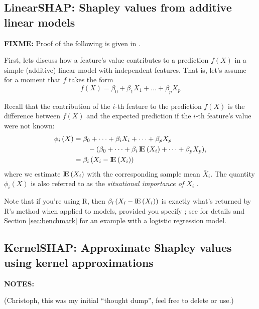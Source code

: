 \subsection{LinearSHAP: Shapley values from additive linear models \label{sec:LinearSHAP}}

\textbf{FIXME:} Proof of the following is given in
\citet{aas-2020-explaining}.

First, lets discuss how a feature's value contributes to a prediction
\(f\left(X\right)\) in a simple (additive) linear model with independent
features. That is, let's assume for a moment that \(f\) takes the form
\begin{equation}
\nonumber
  f\left(X\right) = \beta_0 + \beta_1 X_1 + \dots + \beta_p X_p
\end{equation}

Recall that the contribution of the \(i\)-th feature to the prediction
\(f\left(X\right)\) is the difference between \(f\left(X\right)\) and
the expected prediction if the \(i\)-th feature's value were not known:
\begin{equation}
\nonumber
\begin{split}
  \phi_i\left(X\right) &= \beta_0 + \dots + \beta_i X_i + \dots + \beta_p X_p \\ &\quad\quad - \left(\beta_0 + \dots + \beta_i \E\left(X_i\right) + \dots + \beta_p X_p\right) \\
  &= \beta_i \left(X_i - \E\left(X_i\right)\right)
\end{split},
\end{equation} where we estimate \(\E\left(X_i\right)\) with the
corresponding sample mean \(\bar{X}_i\). The quantity
\(\phi_i\left(X\right)\) is also referred to as the
\emph{situational importance of $X_i$} \citep{achen-1982-interpreting}.

Note that if you're using R, then
\(\beta_i \left(X_i - \E\left(X_i\right)\right)\) is exactly what's
returned by R's  method when applied to 
models, provided you specify ; see
 for details and Section \ref{sec:benchmark} for an
example with a logistic regression model.

\subsection{KernelSHAP: Approximate Shapley values using kernel approximations}

\textbf{NOTES:}

(Christoph, this was my initial ``thought dump'', feel free to delete or
use.)

